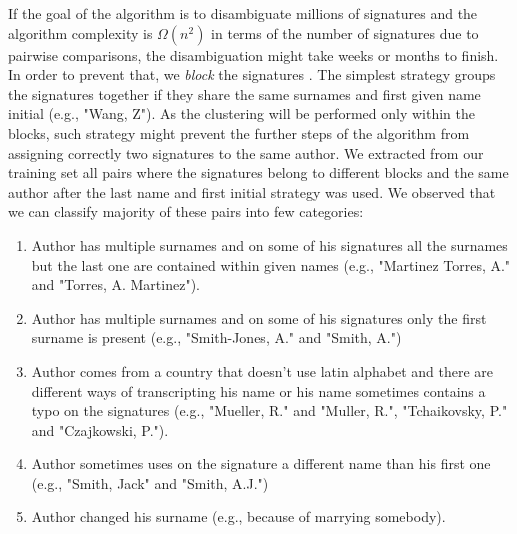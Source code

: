 \documentclass{article}
\begin{document}
If the goal of the algorithm is to disambiguate millions of signatures and the algorithm
complexity is $\Omega{(n^2)}$ in terms of the number of signatures due to pairwise
comparisons, the disambiguation might take weeks or months to finish. In order to prevent
that, we \textit{block} the signatures \citep{fellegi69}. The simplest strategy groups the
signatures together if they share the same surnames and first given name initial (e.g.,
"Wang, Z"). As the clustering will be performed only within the
blocks, such strategy might prevent the further steps of the algorithm from assigning
correctly two signatures to the same author. We extracted from our training set all pairs
where the signatures belong to different blocks and the same author after the last name and
first initial strategy was used. We observed that we can classify majority of these pairs
into few categories:
\begin{enumerate}
  \item Author has multiple surnames and on some of his signatures all the surnames but the
  last one are contained within given names (e.g., "Martinez Torres, A." and "Torres, A.
  Martinez").
  \item Author has multiple surnames and on some of his signatures only the first surname is
  present (e.g., "Smith-Jones, A." and "Smith, A.")
  \item Author comes from a country that doesn't use latin alphabet and there are different
  ways of transcripting his name or his name sometimes contains a typo on the signatures
  (e.g., "Mueller, R." and "Muller, R.", "Tchaikovsky, P." and "Czajkowski, P.").
  \item Author sometimes uses on the signature a different name than his first one (e.g.,
  "Smith, Jack" and "Smith, A.J.")
  \item Author changed his surname (e.g., because of marrying somebody).
\end{enumerate}
\end{document}
